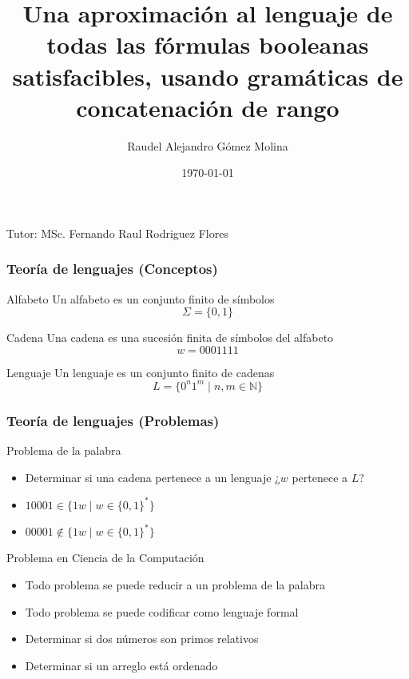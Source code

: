 \documentclass{beamer}
\title{Una aproximación al lenguaje de todas las fórmulas booleanas satisfacibles, usando gramáticas de concatenación de rango}
\author{Raudel Alejandro Gómez Molina}
\institute{Facultad de Matemática y Computación \\ Universidad de La Habana}
\date{\today}
\newcommand{\tutor}{MSc. Fernando Raul Rodriguez Flores} %
\begin{document}
\begin{frame}
    \titlepage
    \vspace{1cm} %
    \begin{center}
        Tutor: \tutor \\ %
        \smallskip
    \end{center}
\end{frame}

\begin{frame}
    \frametitle{Teoría de lenguajes (Conceptos)}

    \begin{block}{Alfabeto}
        Un alfabeto es un conjunto finito de símbolos
        $$\Sigma=\{0,1\}$$
    \end{block}

    \pause

    \begin{block}{Cadena}
        Una cadena es una sucesión finita de símbolos del alfabeto
        $$w=0001111$$
    \end{block}

    \pause

    \begin{block}{Lenguaje}
        Un lenguaje es un conjunto finito de cadenas
        $$L=\{0^n1^m\mid n,m\in \mathbb{N}\}$$
    \end{block}
\end{frame}

\begin{frame}
    \frametitle{Teoría de lenguajes (Problemas)}

    \begin{block}{Problema de la palabra}
        \begin{itemize}
            \item Determinar si una cadena pertenece a un lenguaje ¿$w$ pertenece a $L$?
                  \pause
            \item $10001\in \{1w\mid w\in\{0,1\}^*\}$
                  \pause
            \item $00001\notin \{1w\mid w\in\{0,1\}^*\}$
        \end{itemize}

    \end{block}

    \pause

    \begin{block}{Problema en Ciencia de la Computación}
        \begin{itemize}
            \item Todo problema se puede reducir a un problema de la palabra
                  \pause
            \item Todo problema se puede codificar como lenguaje formal
                  \pause
            \item Determinar si dos números son primos relativos
                  \pause
            \item Determinar si un arreglo está ordenado
        \end{itemize}
    \end{block}

\end{frame}
\end{document}
